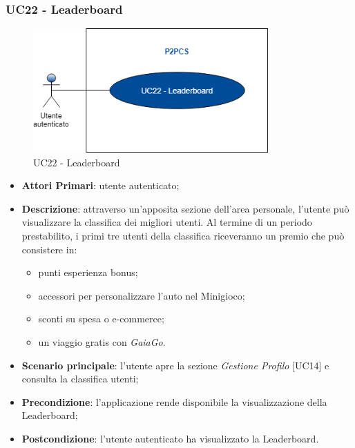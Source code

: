 \subsubsection{UC22 - Leaderboard}
\begin{figure}[h]
	\includegraphics[width=9cm]{res/images/UC22Leaderboard.png}
	\centering
	\caption{UC22 - Leaderboard}
\end{figure}
\begin{itemize}
	\item \textbf{Attori Primari}: utente autenticato;
	\item \textbf{Descrizione}: attraverso un'apposita sezione dell'area personale, l'utente può visualizzare la classifica dei migliori utenti. Al termine di un periodo prestabilito, i primi tre utenti della classifica riceveranno un premio che può consistere in:
	\begin{itemize}
		\item punti esperienza bonus;
		\item accessori per personalizzare l'auto nel Minigioco;
		\item sconti su spesa o e-commerce;
		\item un viaggio gratis con \textit{GaiaGo}.
	\end{itemize}
	\item \textbf{Scenario principale}: l'utente apre la sezione \textit{Gestione Profilo} [UC14] e consulta la classifica utenti;
	\item \textbf{Precondizione}: l'applicazione rende disponibile la visualizzazione della Leaderboard\glo;
	\item \textbf{Postcondizione}: l'utente autenticato ha visualizzato la Leaderboard.
\end{itemize}

